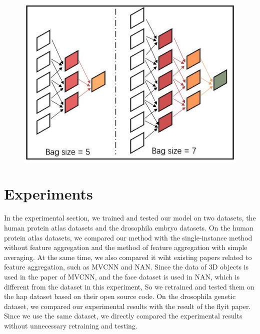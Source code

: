 \documentclass[10pt,twocolumn,letterpaper]{article}
\begin{document}
\begin{figure}[t]
\begin{center}
  \includegraphics[width=1.0\linewidth]{agg_process.JPG}
\end{center}
\label{fig:long}
\label{fig:onecol}
\end{figure}


\section{Experiments}
In the experimental section, we trained and tested our model on two datasets, the human protein atlas datasets and the drosophila embryo datasets. On the human protein atlas datasets, we compared our method with the single-instance method without feature aggregation and the method of feature aggregation with simple averaging. At the same time, we also compared it wiht existing papers related to feature aggregation, such as MVCNN and NAN. Since the data of 3D objects is used in the paper of MVCNN, and the face dataset is used in NAN, which is different from the dataset in this experiment, So we retrained and tested them on the hap dataset based on their open source code. On the drosophila genetic dataset, we compared our experimental results with the result of the flyit paper. Since we use the same dataset, we directly compared the experimental results without unnecessary retraining and testing.
\end{document}
